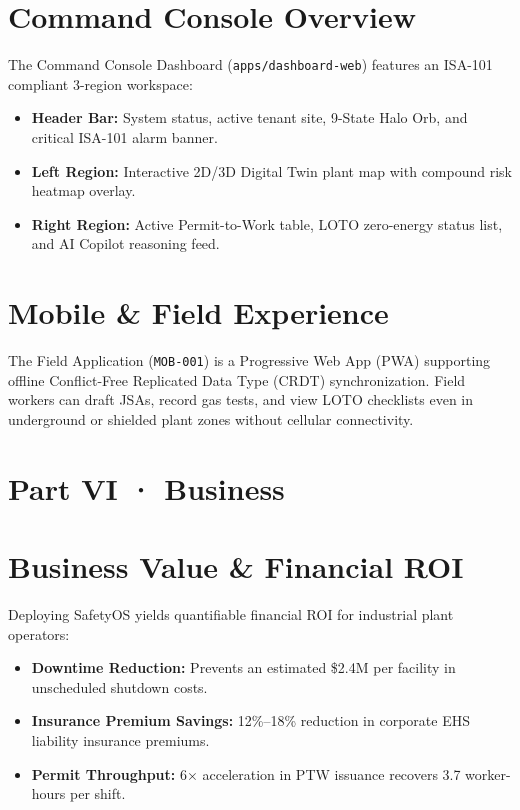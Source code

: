 \documentclass[11pt,a4paper]{article}
\begin{document}
\section{Command Console Overview}
The Command Console Dashboard (\texttt{apps/dashboard-web}) features an ISA-101 compliant 3-region workspace:
\begin{itemize}
    \item \textbf{Header Bar:} System status, active tenant site, 9-State Halo Orb, and critical ISA-101 alarm banner.
    \item \textbf{Left Region:} Interactive 2D/3D Digital Twin plant map with compound risk heatmap overlay.
    \item \textbf{Right Region:} Active Permit-to-Work table, LOTO zero-energy status list, and AI Copilot reasoning feed.
\end{itemize}

\section{Mobile \& Field Experience}
The Field Application (\texttt{MOB-001}) is a Progressive Web App (PWA) supporting offline Conflict-Free Replicated Data Type (CRDT) synchronization. Field workers can draft JSAs, record gas tests, and view LOTO checklists even in underground or shielded plant zones without cellular connectivity.

\newpage
\section*{Part VI · Business}

\section{Business Value \& Financial ROI}
Deploying SafetyOS yields quantifiable financial ROI for industrial plant operators:
\begin{itemize}
    \item \textbf{Downtime Reduction:} Prevents an estimated \$2.4M per facility in unscheduled shutdown costs.
    \item \textbf{Insurance Premium Savings:} 12\%–18\% reduction in corporate EHS liability insurance premiums.
    \item \textbf{Permit Throughput:} 6$\times$ acceleration in PTW issuance recovers 3.7 worker-hours per shift.
\end{itemize}
\end{document}
